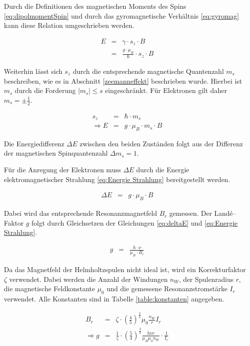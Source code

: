 \documentclass[12pt,a4paper]{scrartcl}
\numberwithin{equation}{section} %
\begin{document}
\noindent
Durch die Definitionen des magnetischen Moments des Spins \eqref{eq:dipolmomentSpin} und durch das gyromagnetische Verhältnis \eqref{eq:gyromag} kann diese Relation umgeschrieben werden.

\begin{eqnarray}
	E &=& \gamma \cdot s_z \cdot B \\
		&=& \frac{g \cdot \mu_B}{\hbar} \cdot s_z \cdot B
\end{eqnarray}

\noindent
Weiterhin lässt sich $s_z$ durch die entsprechende magnetische Quantenzahl $m_s$ beschreiben, wie es in Abschnitt \ref{zeemanneffekt} beschrieben wurde. Hierbei ist $m_s$ durch die Forderung $|m_s|\le s$ eingeschränkt. Für Elektronen gilt daher $m_s=\pm\frac{1}{2}$.

\begin{eqnarray}
	s_z &=& \hbar \cdot m_s \\
	\Rightarrow E &=& g \cdot \mu_B \cdot m_s \cdot B
\end{eqnarray}

\noindent
Die Energiedifferenz $\Delta E$ zwischen den beiden Zuständen folgt aus der Differenz der magnetischen Spinquantenzahl $\Delta m_s = 1$.

Für die Anregung der Elektronen muss $\Delta E$ durch die Energie elektromagnetischer Strahlung \eqref{eq:Energie Strahlung} bereitgestellt werden.

\begin{eqnarray}
	\Delta E &=& g \cdot \mu_B \cdot B \label{eq:deltaE}
\end{eqnarray}

Dabei wird das entsprechende Resonanzmagnetfeld $B_r$ gemessen. Der Landé--Faktor $g$ folgt durch Gleichsetzen der Gleichungen \eqref{eq:deltaE} und \eqref{eq:Energie Strahlung}.

\begin{eqnarray}
	g &=& \frac{h \cdot \nu}{\mu_B \cdot B_r}
\end{eqnarray}

\noindent
Da das Magnetfeld der Helmholtzspulen nicht ideal ist, wird ein Korrekturfaktor $\zeta$ verwendet. Dabei werden die Anzahl der Windungen $n_W$, der Spulenradius $r$, die magnetische Feldkonstante $\mu_0$ und die gemessene Resonanzstromstärke $I_r$ verwendet. Alle Konstanten sind in Tabelle \ref{table:konstanten} angegeben.

\begin{eqnarray}
	B_r &=& \zeta \cdot
			\left(\frac{4}{5}\right)^{\frac{3}{2}}
			\mu_0 \frac{n_W}{r} I_r
			\label{eq:b_r} \\
	\Rightarrow g &=& \frac{1}{\zeta} \cdot
			\left(\frac{5}{4}\right)^{\frac{3}{2}}
			\frac{h \nu r}{\mu_B \mu_0 n_W} \cdot \frac{1}{I_r}
			\label{eq:gFaktor}
\end{eqnarray}
\end{document}
